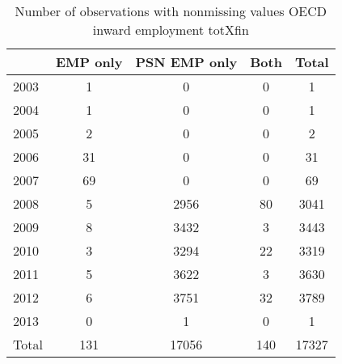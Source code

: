 \begin{table}[htbp]\centering
\caption{Number of observations with nonmissing values OECD inward employment totXfin}
\begin{tabular}{l*{4}{c}}
\toprule
            &    EMP only&PSN EMP only&        Both&       Total\\
\midrule
2003        &           1&           0&           0&           1\\
2004        &           1&           0&           0&           1\\
2005        &           2&           0&           0&           2\\
2006        &          31&           0&           0&          31\\
2007        &          69&           0&           0&          69\\
2008        &           5&        2956&          80&        3041\\
2009        &           8&        3432&           3&        3443\\
2010        &           3&        3294&          22&        3319\\
2011        &           5&        3622&           3&        3630\\
2012        &           6&        3751&          32&        3789\\
2013        &           0&           1&           0&           1\\
Total       &         131&       17056&         140&       17327\\
\bottomrule
\end{tabular}
\end{table}
